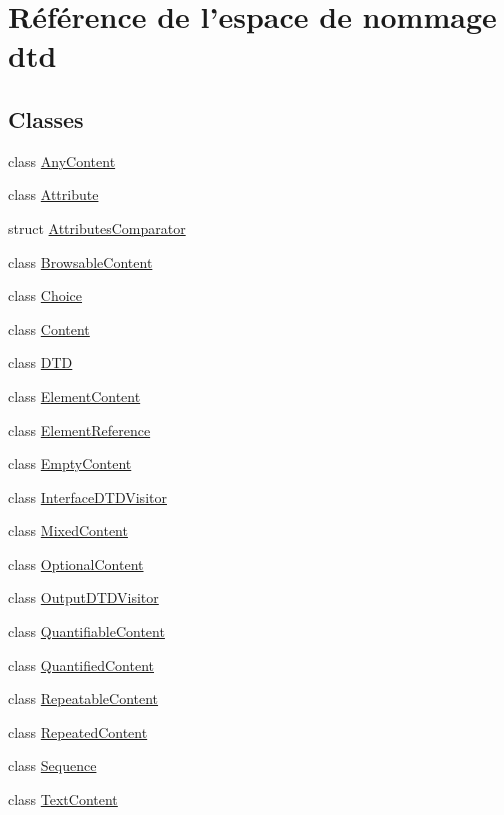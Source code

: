 \hypertarget{namespacedtd}{
\section{Référence de l'espace de nommage dtd}
\label{namespacedtd}
}
\subsection*{Classes}
\begin{DoxyCompactItemize}
\item 
class \hyperlink{classdtd_1_1_any_content}{AnyContent}
\item 
class \hyperlink{classdtd_1_1_attribute}{Attribute}
\item 
struct \hyperlink{structdtd_1_1_attributes_comparator}{AttributesComparator}
\item 
class \hyperlink{classdtd_1_1_browsable_content}{BrowsableContent}
\item 
class \hyperlink{classdtd_1_1_choice}{Choice}
\item 
class \hyperlink{classdtd_1_1_content}{Content}
\item 
class \hyperlink{classdtd_1_1_d_t_d}{DTD}
\item 
class \hyperlink{classdtd_1_1_element_content}{ElementContent}
\item 
class \hyperlink{classdtd_1_1_element_reference}{ElementReference}
\item 
class \hyperlink{classdtd_1_1_empty_content}{EmptyContent}
\item 
class \hyperlink{classdtd_1_1_interface_d_t_d_visitor}{InterfaceDTDVisitor}
\item 
class \hyperlink{classdtd_1_1_mixed_content}{MixedContent}
\item 
class \hyperlink{classdtd_1_1_optional_content}{OptionalContent}
\item 
class \hyperlink{classdtd_1_1_output_d_t_d_visitor}{OutputDTDVisitor}
\item 
class \hyperlink{classdtd_1_1_quantifiable_content}{QuantifiableContent}
\item 
class \hyperlink{classdtd_1_1_quantified_content}{QuantifiedContent}
\item 
class \hyperlink{classdtd_1_1_repeatable_content}{RepeatableContent}
\item 
class \hyperlink{classdtd_1_1_repeated_content}{RepeatedContent}
\item 
class \hyperlink{classdtd_1_1_sequence}{Sequence}
\item 
class \hyperlink{classdtd_1_1_text_content}{TextContent}
\end{DoxyCompactItemize}
